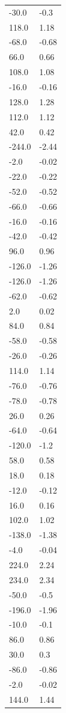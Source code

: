 \begin{longtable}{ll}
-30.0 & -0.3 \\
118.0 & 1.18 \\
-68.0 & -0.68 \\
66.0 & 0.66 \\
108.0 & 1.08 \\
-16.0 & -0.16 \\
128.0 & 1.28 \\
112.0 & 1.12 \\
42.0 & 0.42 \\
-244.0 & -2.44 \\
-2.0 & -0.02 \\
-22.0 & -0.22 \\
-52.0 & -0.52 \\
-66.0 & -0.66 \\
-16.0 & -0.16 \\
-42.0 & -0.42 \\
96.0 & 0.96 \\
-126.0 & -1.26 \\
-126.0 & -1.26 \\
-62.0 & -0.62 \\
2.0 & 0.02 \\
84.0 & 0.84 \\
-58.0 & -0.58 \\
-26.0 & -0.26 \\
114.0 & 1.14 \\
-76.0 & -0.76 \\
-78.0 & -0.78 \\
26.0 & 0.26 \\
-64.0 & -0.64 \\
-120.0 & -1.2 \\
58.0 & 0.58 \\
18.0 & 0.18 \\
-12.0 & -0.12 \\
16.0 & 0.16 \\
102.0 & 1.02 \\
-138.0 & -1.38 \\
-4.0 & -0.04 \\
224.0 & 2.24 \\
234.0 & 2.34 \\
-50.0 & -0.5 \\
-196.0 & -1.96 \\
-10.0 & -0.1 \\
86.0 & 0.86 \\
30.0 & 0.3 \\
-86.0 & -0.86 \\
-2.0 & -0.02 \\
144.0 & 1.44 \\

\end{longtable}

